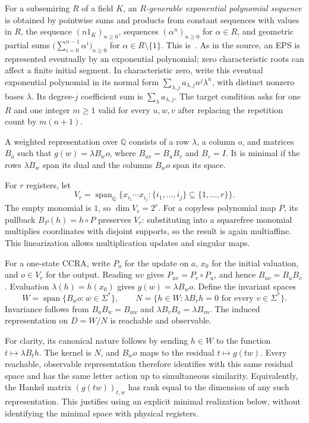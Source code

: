 \documentclass[acmlarge,screen,11pt,nonacm]{acmart}
\newcommand{\Q}{\mathbb{Q}}
\newcommand{\spn}{\operatorname{span}}
\newcommand{\eps}{\varepsilon}
\theoremstyle{definition}
\begin{document}
For a subsemiring $R$ of a field $K$, an \emph{$R$-generable exponential polynomial sequence} is obtained by pointwise sums and products from constant sequences with values in $R$, the sequence $(n1_K)_{n\geq0}$, sequences $(\alpha^n)_{n\geq0}$ for $\alpha\in R$, and geometric partial sums $\bigl(\sum_{i=0}^{n-1}\alpha^i\bigr)_{n\geq0}$ for $\alpha\in R\setminus\{1\}$. This is~\cite[Definition~11]{MPS26}. As in the source, an EPS is represented eventually by an exponential polynomial; zero characteristic roots can affect a finite initial segment. In characteristic zero, write this eventual exponential polynomial in its normal form $\sum_{\lambda,j}a_{\lambda,j}n^j\lambda^n$, with distinct nonzero bases $\lambda$. Its degree-$j$ coefficient sum is $\sum_\lambda a_{\lambda,j}$. The target condition asks for one $R$ and one integer $m\geq1$ valid for every $u,w,v$ after replacing the repetition count by $m(n+1)$.

A weighted representation over $\Q$ consists of a row $\lambda$, a column $o$, and matrices $B_a$ such that $g(w)=\lambda B_w o$, where $B_{uv}=B_uB_v$ and $B_\eps=I$. It is minimal if the rows $\lambda B_w$ span its dual and the columns $B_w o$ span its space.

For $r$ registers, let
\[
 V_r=\spn_\Q\{x_{i_1}\cdots x_{i_j}:\{i_1,\ldots,i_j\}\subseteq\{1,\ldots,r\}\}.
\]
The empty monomial is $1$, so $\dim V_r=2^r$. For a copyless polynomial map $P$, its pullback $B_P(h)=h\circ P$ preserves $V_r$: substituting into a squarefree monomial multiplies coordinates with disjoint supports, so the result is again multiaffine. This linearization allows multiplication updates and singular maps.

For a one-state CCRA, write $P_a$ for the update on $a$, $x_0$ for the initial valuation, and $o\in V_r$ for the output. Reading $uv$ gives $P_{uv}=P_v\circ P_u$, and hence $B_{uv}=B_uB_v$. Evaluation $\lambda(h)=h(x_0)$ gives $g(w)=\lambda B_w o$. Define the invariant spaces
\begin{equation}\label{eq:WN}
 W=\spn\{B_w o:w\in\Sigma^*\},\qquad
 N=\{h\in W:\lambda B_vh=0\text{ for every }v\in\Sigma^*\}.
\end{equation}
Invariance follows from $B_aB_w=B_{aw}$ and $\lambda B_vB_a=\lambda B_{va}$. The induced representation on $D=W/N$ is reachable and observable.

For clarity, its canonical nature follows by sending $h\in W$ to the function $t\mapsto\lambda B_t h$. The kernel is $N$, and $B_w o$ maps to the residual $t\mapsto g(tw)$. Every reachable, observable representation therefore identifies with this same residual space and has the same letter action up to simultaneous similarity. Equivalently, the Hankel matrix $(g(tw))_{t,w}$ has rank equal to the dimension of any such representation. This justifies using an explicit minimal realization below, without identifying the minimal space with physical registers.
\end{document}
